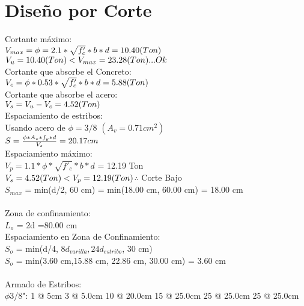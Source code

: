 \documentclass{article}%
\begin{document}
%
\section{Diseño por Corte}%
\label{sec:DiseoporCorte}%
Cortante máximo: \\$ V_{max} = \phi=2.1*\sqrt{f'_{c}}*b*d = 10.40(Ton) \\ $$ V_{u} = 10.40 (Ton) < V_{max} = 23.28 (Ton) ... Ok \\$\\ Cortante que absorbe el Concreto: \\$ V_{c}=\phi*0.53*\sqrt{f'_{c}}*b*d = 5.88(Ton) \\$\\Cortante que absorbe el acero:\\ $ V_{s} = V_{u} - V_{c} = 4.52(Ton) \\$\\ Espaciamiento de estribos: \\ Usando acero de $\phi = 3/8$  $(A_{v} = 0.71 cm^{2}) $\\$ S = \frac{\phi*A_{v}*f_{y}*d}{V_{s}} = 20.17 cm \\$\\ Espaciamiento máximo: \\$ V_p = 1.1*\phi*\sqrt{f'_{c}}*b*d $ = 12.19 Ton\\$ V_{s} = 4.52 (Ton) < V_{p} = 12.19 (Ton) \\$$\therefore$ Corte Bajo \\$ S_{max} $ = min(d/2, 60 cm) = min(18.00 cm, 60.00 cm) = 18.00 cm \\ \\ Zona de confinamiento: \\$L_{o}$ = 2d =80.00 cm \\Espaciamiento en Zona de Confinamiento: \\$S_{o}$ = min(d/4, $8d_{varilla}, 24d_{estribo}$, 30 cm) \\$S_{o}$ = min(3.60 cm,15.88 cm, 22.86 cm, 30.00 cm) = 3.60 cm \\ \\ Armado de Estribos: \\$\phi$3/8": 1 @ 5cm 3 @ 5.0cm 10 @ 20.0cm 15 @ 25.0cm 25 @ 25.0cm 25 @ 25.0cm 

%
\end{document}
